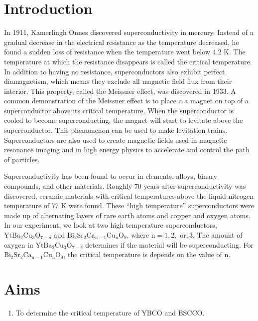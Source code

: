 \documentclass[prb,preprint]{revtex4-1}
\begin{document}
\section{Introduction} %
In 1911, Kamerlingh Onnes discovered superconductivity in mercury.  
Instead of a gradual decrease in the electrical resistance as the temperature decreased, he found a sudden loss of resistance when the temperature went below 4.2 K. 
The temperature at which the resistance disappears is called the critical temperature.
In addition to having no resistance, superconductors also exhibit perfect diamagnetism, which means they exclude all magnetic field flux from their interior. 
This property, called the Meissner effect, was discovered in 1933.\cite{intro}
A common demonstration of the Meissner effect is to place a a magnet on top of a superconductor above its critical temperature. When the superconductor is cooled to become superconducting, the magnet will start to levitate above the superconductor. 
This phenomenon can be used to make levitation trains.  Superconductors are also used to create magnetic fields used in magnetic resonance imaging and in high energy physics to accelerate and control the path of particles.\cite{kumar}

Superconductivity has been found to occur in elements, alloys, binary compounds, and other materials.  
Roughly 70 years after superconductivity was discovered, ceramic materials with critical temperatures above the liquid nitrogen temperature of 77 K were found.\cite{melissinos} 
These ``high temperature'' superconductors were made up of alternating layers of rare earth atoms and copper and oxygen atoms.\cite{kumar} 
In our experiment, we look at two high temperature superconductors, $\textrm{Yt}\textrm{Ba}_{2}\textrm{Cu}_{3}\textrm{O}_{7-\delta}$ and $\textrm{Bi}_{2}\textrm{Sr}_{2}\textrm{Ca}_{\textrm{n}-1}\textrm{Cu}_{\textrm{n}}\textrm{O}_{9}$, where $\textrm{n}=1,2,\textrm{ or},3$. %
The amount of oxygen in $\textrm{Yt}\textrm{Ba}_{2}\textrm{Cu}_{3}\textrm{O}_{7-\delta}$ determines if the material will be superconducting. For $\textrm{Bi}_{2}\textrm{Sr}_{2}\textrm{Ca}_{\textrm{n}-1}\textrm{Cu}_{\textrm{n}}\textrm{O}_{9}$, the critical temperature is depends on the value of n.

 
\section{Aims}
\begin{enumerate}
\item To determine the critical temperature of YBCO and BSCCO.
\end{enumerate}
\end{document}
